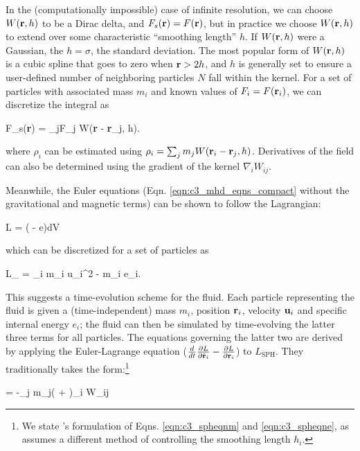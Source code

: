 \noindent In the (computationally impossible) case of infinite resolution, we can choose $W({\bf r}, h)$ to be a Dirac delta, and $F_s({\bf r}) = F({\bf r})$, but in practice we choose $W({\bf r}, h)$ to extend over some characteristic ``smoothing length'' $h$.  If $W({\bf r}, h)$ were a Gaussian, the $h = \sigma$, the standard deviation.  The most popular form of $W({\bf r}, h)$ is a cubic spline that goes to zero when ${\bf r} > 2h$, and $h$ is generally set to ensure a user-defined number of neighboring particles $N$ fall within the kernel.  For a set of particles with associated mass $m_i$ and known values of $F_i = F({\bf r}_i)$, we can discretize the integral as

\eqbegin
F_s({\bf r}) = \sum_jF_j W({\bf r} - {\bf r}_j, h).
\label{eq:c3_kernelavg}
\eqend

\noindent where $\rho_i$ can be estimated using $\rho_i = \sum_j m_j W({\bf r}_i - {\bf r}_j, h)$.  Derivatives of the field can also be determined using the gradient of the kernel $\nabla_i W_{ij}$.

Meanwhile, the Euler equations (Eqn. \ref{eqn:c3_mhd_eqns_compact} without the gravitational and magnetic terms) can be shown to follow the Lagrangian:

\eqbegin
L = \int \rho\left( - e\right)dV
\label{eqn:c3_lagrangian}
\eqend

\noindent which can be discretized for a set of particles as

\eqbegin
L_ = \sum_i m_i u_i^2 - m_i e_i.
\eqend

\noindent This suggests a time-evolution scheme for the fluid.  Each particle representing the fluid is given a (time-independent) mass $m_i$, position ${\bf r}_i$, velocity ${\bf u}_i$ and specific internal energy $e_i$; the fluid can then be simulated by time-evolving the latter three terms for all particles.  The equations governing the latter two are derived by applying the Euler-Lagrange equation ($\frac{d}{dt}\frac{\partial L}{\partial \dot{{\bf r}}_i} - \frac{\partial L}{\partial {\bf r}_i}$) to $L_\mathrm{SPH}$.  They traditionally takes the form:\footnote{We state \cite{wadssq04}'s formulation of Eqns. \ref{eqn:c3_spheqnm} and \ref{eqn:c3_spheqne}, as \cite{spri10rev} assumes a different method of controlling the smoothing length $h_i$.}

\eqbegin
{} = -\sum_j m_j\left( +  \right)\nabla_i W_{ij}
\label{eqn:c3_spheqnm}
\eqend

